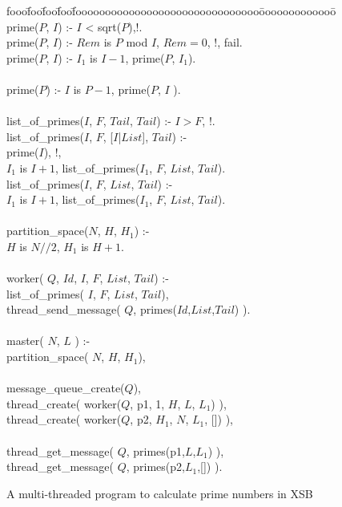 \begin{figure}
\begin{center}
\begin{tt}
\begin{tabbing}
fooo\=foo\=foo\=foo\=fooooooooooooooooooooooooooooooo\=ooooooooooooo\=\kill
prime($P$, $I$) :- $I$ < sqrt($P$),!.\\
prime($P$, $I$) :- $Rem$ is $P$ mod $I$, $Rem = 0$, !, fail.\\
prime($P$, $I$) :- $I_1$ is $I - 1$, prime($P$, $I_1$).\\
\\
prime($P$) :- $I$ is $P - 1$, prime($P$, $I$ ).\\
\\
list\_of\_primes($I$, $F$, $Tail$, $Tail$) :- $I > F$, !.\\
list\_of\_primes($I$, $F$, [$I$|$List$], $Tail$) :-\\
\>        prime($I$), !,\\
\>        $I_1$ is $I + 1$, list\_of\_primes($I_1$, $F$, $List$, $Tail$).\\
list\_of\_primes($I$, $F$, $List$, $Tail$) :-\\
\>        $I_1$ is $I + 1$, list\_of\_primes($I_1$, $F$, $List$, $Tail$).\\
\\
partition\_space($N$, $H$, $H_1$) :-\\
\>        $H$ is $N//2$, $H_1$ is $H + 1$.\\
\\
worker( $Q$, $Id$, $I$, $F$, $List$, $Tail$) :-\\
\>        list\_of\_primes( $I$, $F$, $List$, $Tail$),\\
\>        thread\_send\_message( $Q$, primes($Id$,$List$,$Tail$) ).\\
\\
master( $N$, $L$ )  :-\\
\>        partition\_space( $N$, $H$, $H_1$),\\
\\
\>       message\_queue\_create($Q$),\\
\>        thread\_create( worker($Q$, p1, 1,  $H$, $L$,  $L_1$) ),\\
\>        thread\_create( worker($Q$, p2, $H_1$, $N$, $L_1$, []) ),\\
\\
\>        thread\_get\_message( $Q$, primes(p1,$L$,$L_1$) ),\\
\>        thread\_get\_message( $Q$, primes(p2,$L_1$,[]) ).
\end{tabbing}
\end{tt}
\end{center}
\caption{A multi-threaded program to calculate prime numbers in XSB}
\label{fig:ex-primes}
\end{figure}


